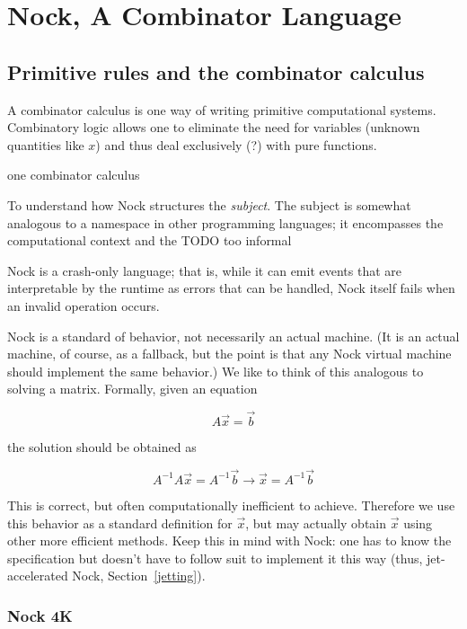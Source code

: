 \setchapterpreamble[u]{\margintoc}
\chapter{Nock, A Combinator Language}


\section{Primitive rules and the combinator calculus}


A combinator calculus is one way of writing primitive computational systems.  Combinatory logic allows one to eliminate the need for variables (unknown quantities like $x$) and thus deal exclusively (?) with pure functions.

one combinator calculus



To understand how Nock structures
the \emph{subject}.  The subject is somewhat analogous to a namespace in other programming languages; it encompasses the computational context and the
TODO too informal

Nock is a crash-only language; that is, while it can emit events that are interpretable by the runtime as errors that can be handled, Nock itself fails when an invalid operation occurs.

Nock is a standard of behavior, not necessarily an actual machine.  (It is an actual machine, of course, as a fallback, but the point is that any Nock virtual machine should implement the same behavior.)  We like to think of this analogous to solving a matrix.  Formally, given an equation

$$
A \vec{x} = \vec{b}
$$

the solution should be obtained as

$$
A^{-1} A \vec{x} = A^{-1} \vec{b} \rightarrow \vec{x} = A^{-1} \vec{b}
$$

This is correct, but often computationally inefficient to achieve.  Therefore we use this behavior as a standard definition for $\vec{x}$, but may actually obtain $\vec{x}$ using other more efficient methods.  Keep this in mind with Nock:  one has to know the specification but doesn't have to follow suit to implement it this way (thus, jet-accelerated Nock, Section~\ref{jetting}).

\subsection{Nock 4K}

